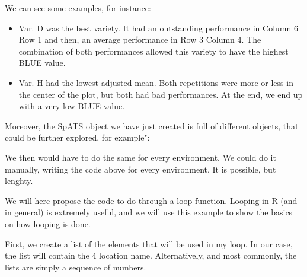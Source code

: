 \documentclass[
]{book}
\newenvironment{Shaded}{\begin{snugshade}}{\end{snugshade}}
\newcommand{\CommentTok}[1]{\textcolor[rgb]{0.56,0.35,0.01}{\textit{#1}}}
\newcommand{\FunctionTok}[1]{\textcolor[rgb]{0.00,0.00,0.00}{#1}}
\newcommand{\NormalTok}[1]{#1}
\newcommand{\OtherTok}[1]{\textcolor[rgb]{0.56,0.35,0.01}{#1}}
\newcommand{\SpecialCharTok}[1]{\textcolor[rgb]{0.00,0.00,0.00}{#1}}
\begin{document}
We can see some examples, for instance:

\begin{itemize}
\item
  Var. D was the best variety. It had an outstanding performance in Column 6 Row 1 and then, an average performance in Row 3 Column 4. The combination of both performances allowed this variety to have the highest BLUE value.
\item
  Var. H had the lowest adjusted mean. Both repetitions were more or less in the center of the plot, but both had bad performances. At the end, we end up with a very low BLUE value.
\end{itemize}

Moreover, the SpATS object we have just created is full of different objects, that could be further explored, for example":

\begin{Shaded}
\end{Shaded}

We then would have to do the same for every environment. We could do it manually, writing the code above for every environment. It is possible, but lenghty.

We will here propose the code to do through a loop function. Looping in R (and in general) is extremely useful, and we will use this example to show the basics on how looping is done.

First, we create a list of the elements that will be used in my loop. In our case, the list will contain the 4 location name. Alternatively, and most commonly, the lists are simply a sequence of numbers.

\begin{Shaded}
\end{Shaded}
\end{document}
